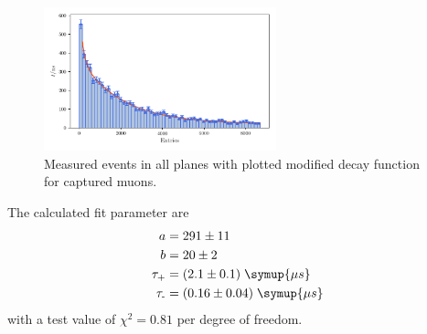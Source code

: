 \begin{figure}
	 \centering
	 \includegraphics[width=0.6\textwidth]{plots/ptest.pdf}
	 \caption{Measured events in all planes with plotted modified decay function for captured muons.}
	 \label{fig:ptest}
\end{figure}
	
The calculated fit parameter are
	\begin{align*}
	 a &= 291 \pm 11\\
	 b &= 20 \pm 2 \\
	 \tau_{\text{+}} &= (2.1 \pm 0.1) \; \symup{\mu s}\\
	 \tau_{\text{-}} &= (0.16 \pm 0.04) \; \symup{\mu s}
	\end{align*}
with a test value of $\chi^2 = 0.81$ per degree of freedom.
